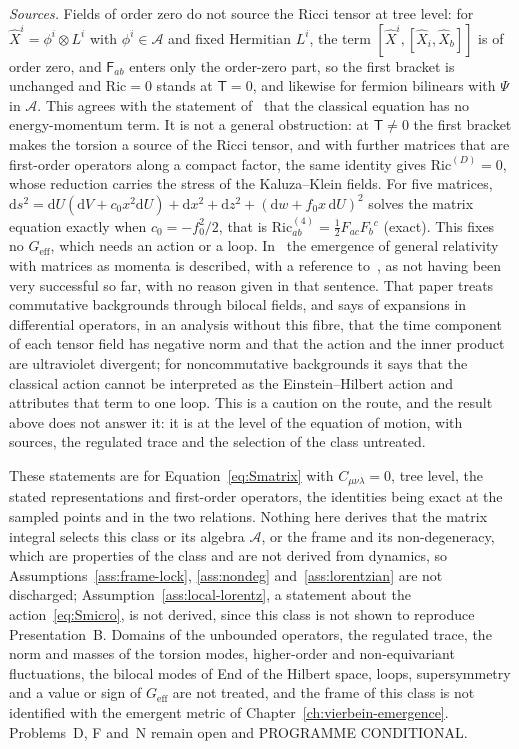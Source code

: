\emph{Sources.} Fields of order zero do not source the Ricci tensor at tree level: for \(\hat X^i=\phi^i\otimes L^i\) with \(\phi^i\in\mathcal A\) and fixed Hermitian \(L^i\), the term \([\hat X^i,[\hat X_i,\hat X_b]]\) is of order zero, and \(\mathsf F_{ab}\) enters only the order-zero part, so the first bracket is unchanged and \(\mathrm{Ric}=0\) stands at \(\mathsf T=0\), and likewise for fermion bilinears with \(\Psi\) in \(\mathcal A\). This agrees with the statement of~\cite{HanadaKawaiKimura2006} that the classical equation has no energy-momentum term. It is not a general obstruction: at \(\mathsf T\neq0\) the first bracket makes the torsion a source of the Ricci tensor, and with further matrices that are first-order operators along a compact factor, the same identity gives \(\mathrm{Ric}^{(D)}=0\), whose reduction carries the stress of the Kaluza--Klein fields. For five matrices, \(\mathrm ds^2=\mathrm dU(\mathrm dV+c_0x^2\mathrm dU)+\mathrm dx^2+\mathrm dz^2+(\mathrm dw+f_0x\,\mathrm dU)^2\) solves the matrix equation exactly when \(c_0=-f_0^2/2\), that is \(\mathrm{Ric}^{(4)}_{ab}=\tfrac12F_{ac}F_b{}^c\) (exact). This fixes no \(G_{\mathrm{eff}}\), which needs an action or a loop. In~\cite{HoKawaiSteinacker2025} the emergence of general relativity with matrices as momenta is described, with a reference to~\cite{HanadaKawaiKimura2006}, as not having been very successful so far, with no reason given in that sentence. That paper treats commutative backgrounds through bilocal fields, and says of expansions in differential operators, in an analysis without this fibre, that the time component of each tensor field has negative norm and that the action and the inner product are ultraviolet divergent; for noncommutative backgrounds it says that the classical action cannot be interpreted as the Einstein--Hilbert action and attributes that term to one loop. This is a caution on the route, and the result above does not answer it: it is at the level of the equation of motion, with sources, the regulated trace and the selection of the class untreated.

These statements are for Equation~\eqref{eq:Smatrix} with \(C_{\mu\nu\lambda}=0\), tree level, the stated representations and first-order operators, the identities being exact at the sampled points and in the two relations. Nothing here derives that the matrix integral selects this class or its algebra \(\mathcal A\), or the frame and its non-degeneracy, which are properties of the class and are not derived from dynamics, so Assumptions~\ref{ass:frame-lock}, \ref{ass:nondeg} and~\ref{ass:lorentzian} are not discharged; Assumption~\ref{ass:local-lorentz}, a statement about the action~\eqref{eq:Smicro}, is not derived, since this class is not shown to reproduce Presentation~B. Domains of the unbounded operators, the regulated trace, the norm and masses of the torsion modes, higher-order and non-equivariant fluctuations, the bilocal modes of End of the Hilbert space, loops, supersymmetry and a value or sign of \(G_{\mathrm{eff}}\) are not treated, and the frame of this class is not identified with the emergent metric of Chapter~\ref{ch:vierbein-emergence}. Problems~D, F and~N remain open and PROGRAMME CONDITIONAL.

